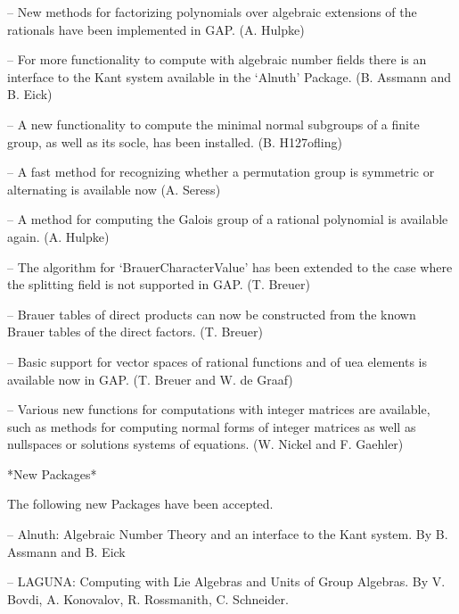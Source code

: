 \item{--}
    New methods for factorizing polynomials over algebraic extensions of
    the rationals have been implemented in GAP. (A. Hulpke)

\item{--}
    For more functionality to compute with algebraic number fields there
    is an interface to the Kant system available in the `Alnuth' Package.
    (B. Assmann and B. Eick)

\item{--}
    A new functionality to compute the minimal normal subgroups
    of a finite group, as well as its socle, has been installed. (B.
    H\accent127ofling)

\item{--}
    A fast method for recognizing whether a permutation group is symmetric
    or alternating is available now (A. Seress)

\item{--}
    A method for computing the Galois group of a rational polynomial is
    available again.  (A. Hulpke)
    
\item{--}
    The algorithm for `BrauerCharacterValue' has been extended to the case
    where the splitting field is not supported in GAP. (T. Breuer)

\item{--}
    Brauer tables of direct products can now be constructed from the
    known Brauer tables of the direct factors. (T. Breuer)

\item{--}
    Basic support for vector spaces of rational functions and of uea
    elements is available now in GAP. (T. Breuer and W. de Graaf)

\item{--}
    Various new functions for computations with integer matrices are
    available, such as methods for computing normal forms of integer
    matrices as well as nullspaces or solutions systems of equations.
    (W. Nickel and F. Gaehler)
\endlist

*New Packages*

  The following new Packages have been accepted.

\beginlist%

\item{--}
   Alnuth: Algebraic Number Theory and an interface to the Kant system.
    By B. Assmann and B. Eick

\item{--}
   LAGUNA: Computing with Lie Algebras and Units of Group Algebras.
    By V. Bovdi, A. Konovalov, R. Rossmanith, C. Schneider.

